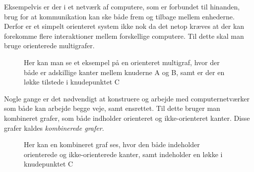 \noindent Eksempelvis er der i et netværk af computere, som er forbundet til hinanden, brug for at kommunikation kan ske både frem og tilbage mellem enhederne. Derfor er et simpelt orienteret system ikke nok da det netop kræves at der kan forekomme flere interaktioner mellem forskellige computere. Til dette skal man bruge orienterede multigrafer.

\begin{figure}[h]
\centering
{}
\caption{Her kan man se et eksempel på en orienteret multigraf, hvor der både er adskillige kanter mellem knuderne A og B, samt er der en løkke tilstede i knudepunktet C }
\end{figure}

\noindent Nogle gange er det nødvendigt at konstruere og arbejde med computernetværker som både kan arbejde begge veje, samt ensrettet. Til dette bruger man kombineret grafer, som både indholder orienteret og ikke-orienteret kanter. Disse grafer kaldes \textit{kombinerede grafer}.

\begin{figure}[!h]
\centering
{}
\caption{Her kan en kombineret graf ses, hvor den både indeholder orienterede og ikke-orienterede kanter, samt indeholder en løkke i knudepunktet C}
\end{figure}

